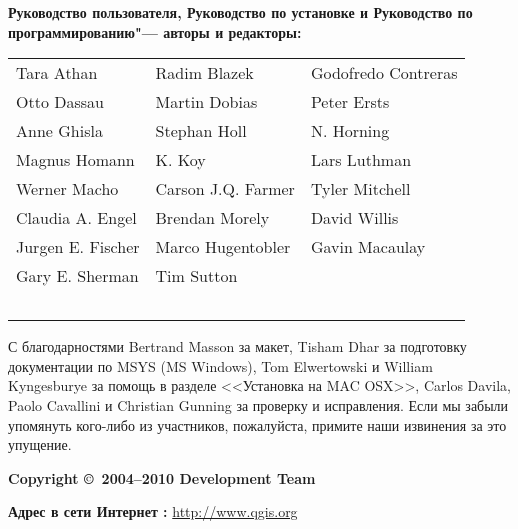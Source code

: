 \newpage

\begin{flushleft}
\textbf{Руководство пользователя, Руководство по установке и Руководство
по программированию"--- авторы и редакторы:}
\par\bigskip\noindent
\begin{tabular}{p{4cm} p{4cm} p{4cm}}
Tara Athan & Radim Blazek & Godofredo Contreras \\
Otto Dassau & Martin Dobias & Peter Ersts \\
Anne Ghisla & Stephan Holl & N. Horning \\
Magnus Homann & K. Koy & Lars Luthman \\
Werner Macho & Carson J.Q. Farmer & Tyler Mitchell \\
Claudia A. Engel & Brendan Morely & David Willis \\
Jurgen E. Fischer & Marco Hugentobler & Gavin Macaulay \\
Gary E. Sherman & Tim Sutton \\ \
\end{tabular}
\end{flushleft}

С благодарностями Bertrand Masson за макет, Tisham Dhar за подготовку
документации по MSYS (MS Windows), Tom Elwertowski и William Kyngesburye
за помощь в разделе <<Установка на MAC OSX>>, Carlos Davila, Paolo
Cavallini и Christian Gunning за проверку и исправления. Если мы
забыли упомянуть кого-либо из участников, пожалуйста, примите наши
извинения за это упущение.
\par\bigskip\noindent
\textbf{Copyright \copyright~2004--2010 \QG Development Team}
\par\bigskip\noindent
\textbf{Адрес в сети Интернет :} \url{http://www.qgis.org}
\par\bigskip\noindent

